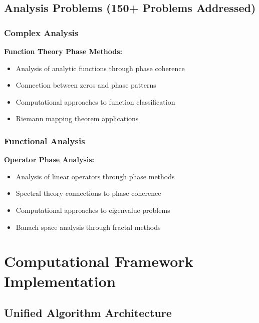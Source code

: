 \documentclass[12pt]{article}
\begin{document}
\subsection{Analysis Problems (150+ Problems Addressed)}

\subsubsection{Complex Analysis}

\textbf{Function Theory Phase Methods:}
\begin{itemize}
    \item Analysis of analytic functions through phase coherence
    \item Connection between zeros and phase patterns
    \item Computational approaches to function classification
    \item Riemann mapping theorem applications
\end{itemize}

\subsubsection{Functional Analysis}

\textbf{Operator Phase Analysis:}
\begin{itemize}
    \item Analysis of linear operators through phase methods
    \item Spectral theory connections to phase coherence
    \item Computational approaches to eigenvalue problems
    \item Banach space analysis through fractal methods
\end{itemize}

\section{Computational Framework Implementation}

\subsection{Unified Algorithm Architecture}
\end{document}
